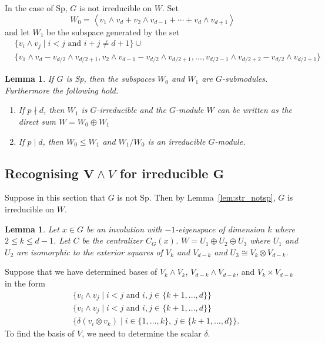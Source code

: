 \documentclass[12pt]{amsart}
\newtheorem{lemma}[theorem]{Lemma}
\theoremstyle{definition}
\renewcommand{\leq}{\leqslant}
\begin{document}
In the case of Sp, $G$ is not irreducible on $W$. Set
\[
W_0=\left<v_1\wedge v_{d}+v_2\wedge v_{d-1}+\cdots+v_{d}\wedge v_{d+1}\right>
\]
and let $W_1$ be the subspace generated by the set
    \begin{align*}
    &\{v_i\wedge v_j\mid i<j\mbox{ and }i+j\neq d+1\}\cup\\
    &\{v_1\wedge v_d-v_{d/2}\wedge v_{d/2+1},v_2\wedge v_{d-1}
    -v_{d/2}\wedge v_{d/2+1},\ldots,v_{d/2-1}\wedge v_{d/2+2}-v_{d/2}\wedge v_{d/2+1}\}
    \end{align*}

\begin{lemma}
  If $G$ is Sp, then the subspaces $W_0$ and $W_1$ are $G$-submodules. Furthermore the following
  hold.
  \begin{enumerate}
    
  \item If $p \nmid d$, then $W_1$ is $G$-irreducible and the $G$-module
    $W$ can be written as the direct
    sum  $W=W_0\oplus W_1$
  \item If $p\mid d$, then $W_0\leq W_1$ and
    $W_1/W_0$ is an irreducible $G$-module.
  \end{enumerate}
\end{lemma}

\subsection{Recognising $\boldsymbol V\wedge V$ for irreducible
  $\boldsymbol G$}
Suppose in this section that $G$ is not Sp. Then by Lemma~\ref{lem:str_notsp}, $G$
is irreducible on $W$.

\begin{lemma}
  Let $x\in G$ be an involution with $-1$-eigenspace of dimension $k$
  where $2\leq k\leq d-1$. Let $C$ be the centralizer $C_G(x)$.
  $W=U_1\oplus U_2\oplus U_3$ where $U_1$ and $U_2$ are isomorphic to
  the exterior squares of $V_k$ and $V_{d-k}$ and $U_3\cong V_k\otimes V_{d-k}$. 
\end{lemma}

Suppose that we have determined bases of $V_k\wedge V_k$,
$V_{d-k}\wedge V_{d-k}$, and $V_k\times V_{d-k}$ in the form
\begin{align*}
  &\{ v_i\wedge v_j\mid i<j\mbox{ and }i,j\in\{k+1,\ldots,d\}\}\\
  &\{ v_i\wedge v_j\mid i<j\mbox{ and }i,j\in\{k+1,\ldots,d\}\}\\
  &\{ \delta(v_i \otimes v_k)\mid i\in\{1,\ldots,k\},\ j\in\{k+1,\ldots,d\}\}.
  \end{align*}
To find the basis of $V$, we need to determine the scalar $\delta$.
\end{document}
